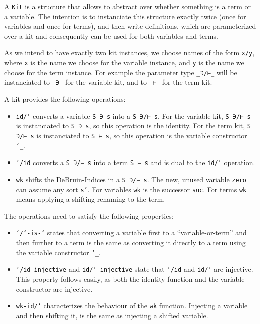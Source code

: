 \documentclass[sigplan,10pt]{acmart}
\newenvironment{LibCode*}{%
  \begin{tcolorbox}[%
    colframe=white,%
    boxrule=0.0pt,%
    top=2.5pt,%
    left=2.5pt,%
    bottom=2.5pt,%
    right=2.5pt,%
    boxsep=0pt%
  ]\vspace{-0.2\baselineskip}%
}{%
  \vspace{-1\baselineskip}%
  \end{tcolorbox}%
}
\newcommand*\LibCode[1]{\begin{LibCode*}{#1}\end{LibCode*}}
\begin{document}
  A \texttt{Kit} is a structure that allows to abstract over whether
  something is a term or a variable. The intention is to instanciate
  this structure exactly twice (once for variables and once for terms),
  and then write definitions, which are parameterized over a kit and
  consequently can be used for both variables and terms.
  \LibCode\KKit

  As we intend to have exactly two kit instances, we choose names of
  the form \texttt{x/y}, where \texttt{x} is the name we choose for the
  variable instance, and \texttt{y} is the name we choose for the term
  instance.
  For example the parameter type \texttt{\_∋/⊢\_} will be instanciated
  to \texttt{\_∋\_} for the variable kit, and to \texttt{\_⊢\_} for the
  term kit.

  A kit provides the following operations:
  \begin{itemize}
  \item 
    \texttt{id/`} converts a variable \texttt{S ∋ s} into a
    \texttt{S ∋/⊢ s}. For the variable kit, \texttt{S ∋/⊢ s} is instanciated to \texttt{S ∋ s}, so this
    operation is the identity. For the term kit, \texttt{S ∋/⊢ s} is
    instanciated to \texttt{S ⊢ s}, so this operation is the
    variable constructor \texttt{`\_}.
  \item 
    \texttt{`/id} converts a \texttt{S ∋/⊢ s} into a term \texttt{S ⊢ s}
    and is dual to the \texttt{id/`} operation.
  \item 
    \texttt{wk} shifts the DeBruin-Indices in a \texttt{S ∋/⊢ s}.
    The new, unused variable \texttt{zero} can assume any sort \texttt{s'}.
    For variables \texttt{wk} is the successor \texttt{suc}.
    For terms \texttt{wk} means applying a shifting renaming to the term.
  \end{itemize}

  The operations need to satisfy the following properties:
  \begin{itemize}
  \item \texttt{`/`-is-`} states that converting a variable first to a ``variable-or-term'' and
    then further to a term is the same as converting it directly to a
    term using the variable constructor \texttt{`\_}.
  \item \texttt{`/id-injective} and \texttt{id/`-injective} state that
    \texttt{`/id} and \texttt{id/`} are injective. This property
    follows easily, as both the identity function and the variable
    constructor are injective.
  \item \texttt{wk-id/`} characterizes the behaviour of the \texttt{wk} function.
    Injecting a variable and then shifting it, is the same as injecting a shifted variable.
  \end{itemize}
\end{document}
